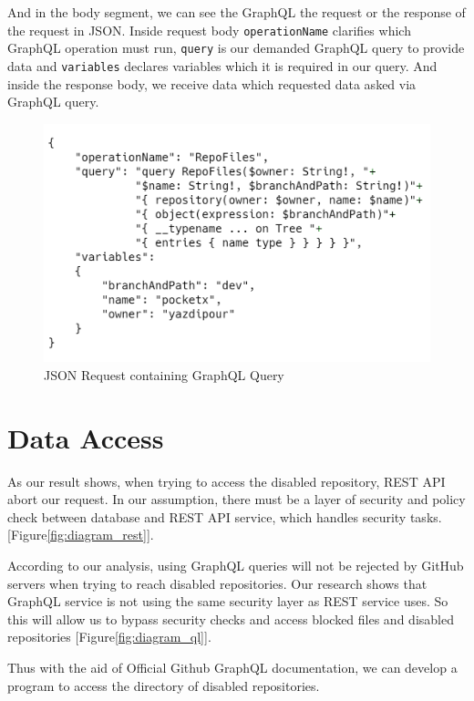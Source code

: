 \documentclass[conference]{IEEEtran}
\begin{document}
And in the body segment, we can see the GraphQL the request or the response of the request in JSON. Inside request body \verb|operationName| clarifies which GraphQL operation must run, \verb|query| is our demanded GraphQL query to provide data and \verb|variables| declares variables which it is required in our query. And inside the response body, we receive data which requested data asked via GraphQL query.

\begin{figure}[hbt!]
  \includegraphics[width=\linewidth]{carbon.png}
  \caption{JSON Request containing GraphQL Query}
  \label{fig:carbon}
\end{figure}

\section{Data Access}

As our result shows, when trying to access the disabled repository, REST API abort our request. In our assumption, there must be a layer of security and policy check between database and REST API service, which handles security tasks.[Figure\ref{fig:diagram_rest}]. 

According to our analysis, using GraphQL queries will not be rejected by GitHub servers when trying to reach disabled repositories. Our research shows that GraphQL service is not using the same security layer as REST service uses. So this will allow us to bypass security checks and access blocked files and disabled repositories [Figure\ref{fig:diagram_ql}].

Thus with the aid of Official Github GraphQL documentation, we can develop a program to access the directory of disabled repositories. 
\end{document}
